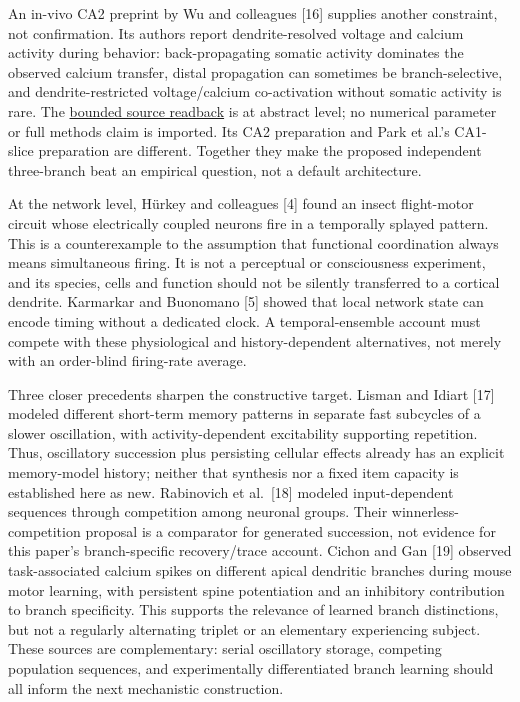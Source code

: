\documentclass[
  american,
  11pt,
  letterpaper,
]{article}
\begin{document}
An in-vivo CA2 preprint by Wu and colleagues {[}16{]} supplies another constraint, not confirmation. Its authors report dendrite-resolved voltage and calcium activity during behavior: back-propagating somatic activity dominates the observed calcium transfer, distal propagation can sometimes be branch-selective, and dendrite-restricted voltage/calcium co-activation without somatic activity is rare. The \href{https://github.com/v5ma/v5ma.github.io/blob/f6d3867df89ae9dea32f763b1d55c84212c41cc6/papers/companions/five-papers-20260923/temporal/paper/reviews/WU-2026-IN-VIVO-BRANCH-TRANSFER-BOUNDARY-20260922.md}{bounded source readback} is at abstract level; no numerical parameter or full methods claim is imported. Its CA2 preparation and Park et al.'s CA1-slice preparation are different. Together they make the proposed independent three-branch beat an empirical question, not a default architecture.

At the network level, Hürkey and colleagues {[}4{]} found an insect flight-motor circuit whose electrically coupled neurons fire in a temporally splayed pattern. This is a counterexample to the assumption that functional coordination always means simultaneous firing. It is not a perceptual or consciousness experiment, and its species, cells and function should not be silently transferred to a cortical dendrite. Karmarkar and Buonomano {[}5{]} showed that local network state can encode timing without a dedicated clock. A temporal-ensemble account must compete with these physiological and history-dependent alternatives, not merely with an order-blind firing-rate average.

Three closer precedents sharpen the constructive target. Lisman and Idiart {[}17{]} modeled different short-term memory patterns in separate fast subcycles of a slower oscillation, with activity-dependent excitability supporting repetition. Thus, oscillatory succession plus persisting cellular effects already has an explicit memory-model history; neither that synthesis nor a fixed item capacity is established here as new. Rabinovich et al.~{[}18{]} modeled input-dependent sequences through competition among neuronal groups. Their winnerless-competition proposal is a comparator for generated succession, not evidence for this paper's branch-specific recovery/trace account. Cichon and Gan {[}19{]} observed task-associated calcium spikes on different apical dendritic branches during mouse motor learning, with persistent spine potentiation and an inhibitory contribution to branch specificity. This supports the relevance of learned branch distinctions, but not a regularly alternating triplet or an elementary experiencing subject. These sources are complementary: serial oscillatory storage, competing population sequences, and experimentally differentiated branch learning should all inform the next mechanistic construction.
\end{document}
